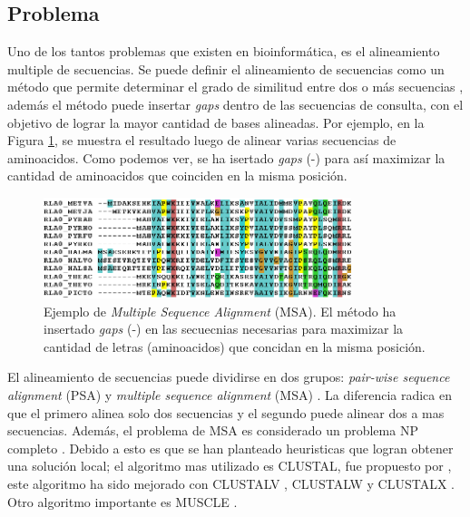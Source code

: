 \documentclass{cup-pan}
\begin{document}
	\subsection{Problema}
	
	Uno de los tantos problemas que existen en bioinformática, es el alineamiento multiple de secuencias. Se puede definir el alineamiento de secuencias como un método que permite determinar el grado de similitud entre dos o más secuencias \citep{xiong2006essential}, además el método puede insertar \textit{gaps} dentro de las secuencias de consulta, con el objetivo de lograr la mayor cantidad de bases alineadas. Por ejemplo, en la Figura \ref{fig:msa}, se muestra el resultado luego de alinear varias secuencias de aminoacidos. Como podemos ver, se ha isertado \textit{gaps} (-) para así maximizar la cantidad de aminoacidos que coinciden en la misma posición. \\
	
	\begin{figure}[h]
		\centering
		\includegraphics[width=0.8\textwidth]{images/msa}
		\caption{Ejemplo de \textit{Multiple Sequence Alignment} (MSA). El método ha insertado \textit{gaps} (-) en las secuecnias necesarias para maximizar la cantidad de letras (aminoacidos) que concidan en la misma posición.}
		\label{fig:msa}
	\end{figure}

	El alineamiento de secuencias puede dividirse en dos grupos: \textit{pair-wise sequence alignment} (PSA) y \textit{multiple sequence alignment} (MSA) \citep{xiong2006essential}. La diferencia radica en que el primero alinea solo dos secuencias y el segundo puede alinear dos a mas secuencias. Además, el problema de MSA es considerado un problema NP completo \citep{wang1994complexity}. Debido a esto es que se han planteado heuristicas que logran obtener una solución local; el algoritmo mas utilizado es CLUSTAL, fue propuesto por \citet{higgins1988clustal}, este algoritmo ha sido mejorado con CLUSTALV \citep{higgins1992clustal}, CLUSTALW \citep{thompson1994clustal} y CLUSTALX \citep{jeanmougin1998multiple}. Otro algoritmo importante es MUSCLE \citep{edgar2004muscle}. \\
	
\end{document}
